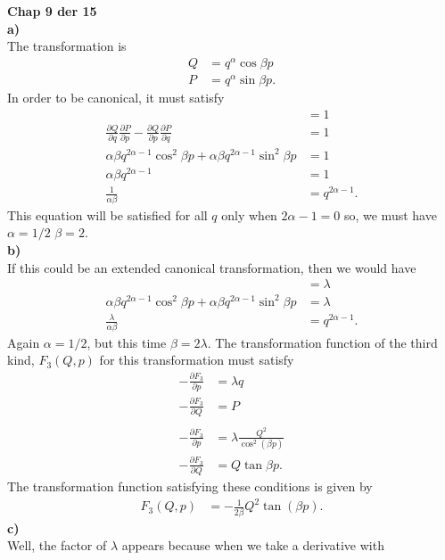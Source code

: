 \documentclass[10pt]{article}
\begin{document}
\textbf{Chap 9 der 15}\\
\textbf{a)}\\
The transformation is
\begin{align*}
  Q &= q^{\alpha}\cos{\beta p}\\
  P &= q^{\alpha}\sin{\beta p}.
\end{align*}
In order to be canonical, it must satisfy
\begin{align*}
  [Q,P] &= 1\\
  \frac{\partial Q}{\partial q}\frac{\partial P}{\partial p} - \frac{\partial Q}{\partial p}\frac{\partial P}{\partial q} &= 1\\
  \alpha\beta q^{2\alpha-1}\cos^2{\beta p} + \alpha\beta q^{2\alpha-1}\sin^2{\beta p} &= 1\\
  \alpha\beta q^{2\alpha-1} &= 1\\
  \frac{1}{\alpha\beta} &= q^{2\alpha-1}.
\end{align*}
This equation will be satisfied for all $q$ only when $2\alpha-1=0$ so, we 
must have $\alpha=1/2$ $\beta=2$.\\
\textbf{b)}\\
If this could be an extended canonical transformation, then we would have
\begin{align*}
  [Q,P] &= \lambda\\
  \alpha\beta q^{2\alpha-1}\cos^2{\beta p} + \alpha\beta q^{2\alpha-1}\sin^2{\beta p} &= \lambda\\
  \frac{\lambda}{\alpha\beta} &= q^{2\alpha-1}.
\end{align*}
Again $\alpha=1/2$, but this time $\beta = 2\lambda$.  The transformation function
of the third kind, $F_3(Q,p)$ for this transformation must satisfy
\begin{align*}
  -\frac{\partial F_3}{\partial p} &= \lambda q\\
  -\frac{\partial F_3}{\partial Q} &= P\\
  \\
  -\frac{\partial F_3}{\partial p} &= \lambda\frac{Q^2}{\cos^2(\beta p)}\\
  -\frac{\partial F_3}{\partial Q} &= Q\tan{\beta p}.
\end{align*}
The transformation function satisfying these conditions is given by
\begin{align*}
  F_3(Q,p) &= -\frac{1}{2\beta}Q^2\tan(\beta p).
\end{align*}
\textbf{c)}\\
Well, the factor of $\lambda$ appears because when we take a derivative with
\end{document}

